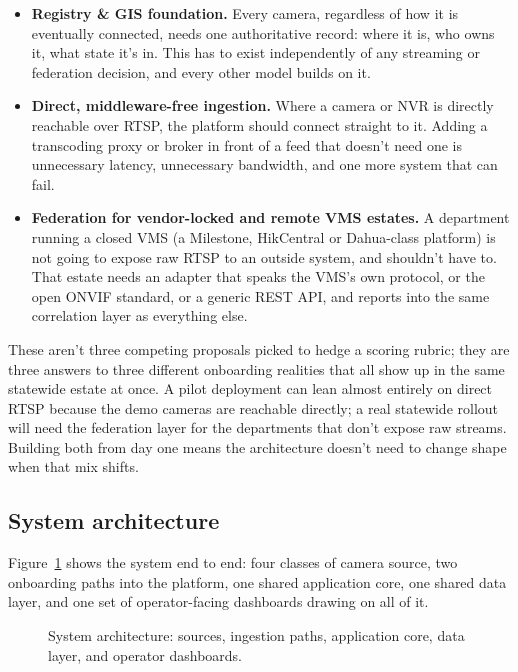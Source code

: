 \documentclass[11pt,a4paper]{article}
\begin{document}
\begin{itemize}
\item \textbf{Registry \& GIS foundation.} Every camera, regardless of how
  it is eventually connected, needs one authoritative record: where it is,
  who owns it, what state it's in. This has to exist independently of
  any streaming or federation decision, and every other model builds on it.
\item \textbf{Direct, middleware-free ingestion.} Where a camera or NVR is
  directly reachable over RTSP, the platform should connect straight to it.
  Adding a transcoding proxy or broker in front of a feed that doesn't need
  one is unnecessary latency, unnecessary bandwidth, and one more system
  that can fail.
\item \textbf{Federation for vendor-locked and remote VMS estates.} A
  department running a closed VMS (a Milestone, HikCentral or Dahua-class
  platform) is not going to expose raw RTSP to an outside system, and
  shouldn't have to. That estate needs an adapter that speaks the VMS's own
  protocol, or the open ONVIF standard, or a generic REST API, and reports
  into the same correlation layer as everything else.
\end{itemize}

These aren't three competing proposals picked to hedge a scoring rubric;
they are three answers to three different onboarding realities that all
show up in the same statewide estate at once. A pilot deployment can lean
almost entirely on direct RTSP because the demo cameras are reachable
directly; a real statewide rollout will need the federation layer for the
departments that don't expose raw streams. Building both from day one means
the architecture doesn't need to change shape when that mix shifts.

\subsection{System architecture}

Figure~\ref{fig:master-arch} shows the system end to end: four classes of
camera source, two onboarding paths into the platform, one shared
application core, one shared data layer, and one set of operator-facing
dashboards drawing on all of it.

\begin{figure}[h]
\centering

\caption{System architecture: sources, ingestion paths, application core,
data layer, and operator dashboards.}
\label{fig:master-arch}
\end{figure}
\end{document}
